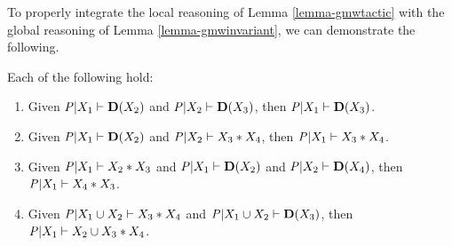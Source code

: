 To properly integrate the local reasoning of Lemma \ref{lemma-gmwtactic} with
the global reasoning of Lemma \ref{lemma-gmwinvariant}, we can demonstrate
the following.
\begin{lemma}
  \label{lemma-conditioning}
  Each of the following hold:
  \begin{enumerate}
    \item Given $\mathit{P}|X_1 \vdash \mathbf{D}(X_2)$ and
      $\mathit{P}|X_2 \vdash \mathbf{D}(X_3)$, then $\mathit{P}|X_1 \vdash \mathbf{D}(X_3)$.
    \item Given $\mathit{P}|X_1 \vdash \mathbf{D}(X_2)$ and
      $\mathit{P}|X_2 \vdash X_3 * X_4$, then $\mathit{P}|X_1 \vdash X_3 * X_4$.
    \item Given $\mathit{P}|X_1 \vdash X_2 * X_3$ and $\mathit{P}|X_1 \vdash \mathbf{D}(X_2)$
      and $\mathit{P}|X_2 \vdash \mathbf{D}(X_4)$, then $\mathit{P}|X_1 \vdash X_4 * X_3$.
    \item Given $\mathit{P}|X_1 \cup X_2 \vdash X_3 * X_4$ and $\mathit{P}|X_1 \cup X_2 \vdash \mathbf{D}(X_3)$,
      then $\mathit{P}|X_1 \vdash X_2 \cup X_3 * X_4$.
  \end{enumerate}
\end{lemma}

